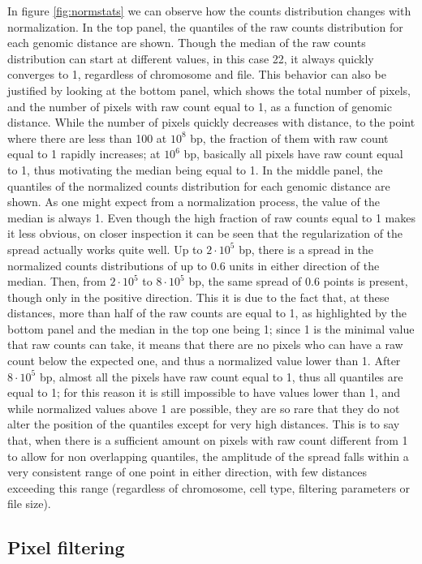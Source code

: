 In figure \ref{fig:normstats} we can observe how the counts distribution changes with normalization. In the top panel, the quantiles of the raw counts distribution for each genomic distance are shown. Though the median of the raw counts distribution can start at different values, in this case 22, it always quickly converges to 1, regardless of chromosome and file. This behavior can also be justified by looking at the bottom panel, which shows the total number of pixels, and the number of pixels with raw count equal to 1, as a function of genomic distance. While the number of pixels quickly decreases with distance, to the point where there are less than 100 at $10^8$ bp, the fraction of them with raw count equal to 1 rapidly increases; at $10^6$ bp, basically all pixels have raw count equal to 1, thus motivating the median being equal to 1. In the middle panel, the quantiles of the normalized counts distribution for each genomic distance are shown. As one might expect from a normalization process, the value of the median is always 1. Even though the high fraction of raw counts equal to 1 makes it less obvious, on closer inspection it can be seen that the regularization of the spread actually works quite well. Up to $2 \cdot 10^5$ bp, there is a spread in the normalized counts distributions of up to $0.6$ units in either direction of the median. Then, from $2 \cdot 10^5$ to $8 \cdot 10^5$ bp, the same spread of $0.6$ points is present, though only in the positive direction. This it is due to the fact that, at these distances, more than half of the raw counts are equal to 1, as highlighted by the bottom panel and the median in the top one being 1; since 1 is the minimal value that raw counts can take, it means that there are no pixels who can have a raw count below the expected one, and thus a normalized value lower than 1. After $8 \cdot 10^5$ bp, almost all the pixels have raw count equal to 1, thus all quantiles are equal to 1; for this reason it is still impossible to have values lower than 1, and while normalized values above 1 are possible, they are so rare that they do not alter the position of the quantiles except for very high distances. This is to say that, when there is a sufficient amount on pixels with raw count different from 1 to allow for non overlapping quantiles, the amplitude of the spread falls within a very consistent range of one point in either direction, with few distances exceeding this range (regardless of chromosome, cell type, filtering parameters or file size).

\subsection{Pixel filtering}

